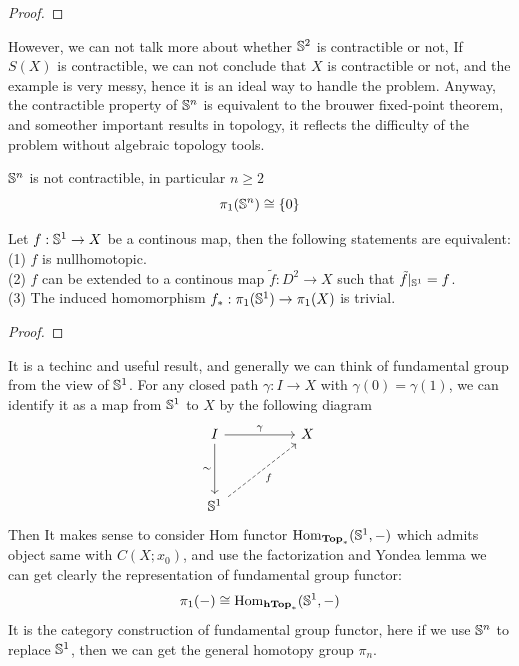 \begin{proof}
    
\end{proof}

However, we can not talk more about whether \(\mathbb{S}^2\) is contractible or not, If \(S(X)\) is contractible, we can not conclude that \(X\) is contractible or not, and the example is very messy, hence it is an ideal way to handle the problem. Anyway, the contractible property of \(\mathbb{S}^n\) is equivalent to the brouwer fixed-point theorem, and someother important results in topology, it reflects the difficulty of the problem without algebraic topology tools.
\begin{claim} 
    \(\mathbb{S}^n\) is not contractible, in particular \(n \geq 2\)
    \[\pi_1(\mathbb{S}^n) \cong \{0\}\]
\end{claim}


\begin{theorem}
    Let \(f:\mathbb{S}^1 \to X\) be a continous map, then the following statements are equivalent:\\

    (1) \(f\) is nullhomotopic.\\

    (2) \(f\) can be extended to a continous map \(\tilde{f}:D^2 \to X\) such that \(\tilde{f}|_{\mathbb{S}^1} = f\).\\

    (3) The induced homomorphism \(f_*:\pi_1(\mathbb{S}^1) \to \pi_1(X)\) is trivial.

\end{theorem}
\begin{proof}
    
\end{proof}

\begin{remark}
    It is a techinc and useful result, and generally we can think of fundamental group from the view of \(\mathbb{S}^1\). For any closed path \(\gamma:I \to X\) with \(\gamma(0) = \gamma(1)\), we can identify it as a map from \(\mathbb{S}^1\) to \(X\) by the following diagram
\[\begin{tikzcd}
	I && X \\
	\\
	{\mathbb{S}^1}
	\arrow["\gamma", from=1-1, to=1-3]
	\arrow["\sim"', from=1-1, to=3-1]
	\arrow["{f}"', dashed, from=3-1, to=1-3]
\end{tikzcd}\]
    Then It makes sense to consider Hom functor \(\operatorname{Hom}_{\mathbf{Top}_*}(\mathbb{S}^1,-)\) which admits object same with \(C(X;x_0)\), and use the factorization and Yondea lemma we can get clearly the representation of fundamental group functor:
    \[\pi_1(-) \cong \operatorname{Hom}_{\mathbf{hTop}_*}(\mathbb{S}^1,-)\]
    It is the category construction of fundamental group functor, here if we use \(\mathbb{S}^n\) to replace \(\mathbb{S}^1\), then we can get the general homotopy group \(\pi_n\).

\end{remark}

